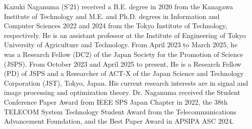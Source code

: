 \documentclass[10pt,journal]{IEEEtran}
\begin{document}
\begin{IEEEbiography}{Kazuki Naganuma} (S’21) received a B.E. degree in 2020 from the Kanagawa Institute of Technology and M.E. and Ph.D. degrees in Information and Computer Sciences 2022 and 2024 from the Tokyo Institute of Technology, respectively.
He is an assistant professor at the Institute of Engineering of Tokyo University of Agriculture and Technology.
From April 2023 to March 2025, he was a Research Fellow (DC2) of the Japan Society for the Promotion of Science (JSPS). From October 2023 and April 2025 to present, He is a Research Fellow (PD) of JSPS and a Researcher of ACT-X of the Japan Science and Technology Corporation (JST), Tokyo, Japan.
His current research interests are in signal and image processing and optimization theory.
Dr. Naganuma received the Student Conference Paper Award from IEEE SPS Japan Chapter in 2022, the 38th TELECOM System Technology Student Award from the Telecommunications Advancement Foundation, and the Best Paper Award in APSIPA ASC 2024.
\end{IEEEbiography}
\end{document}
